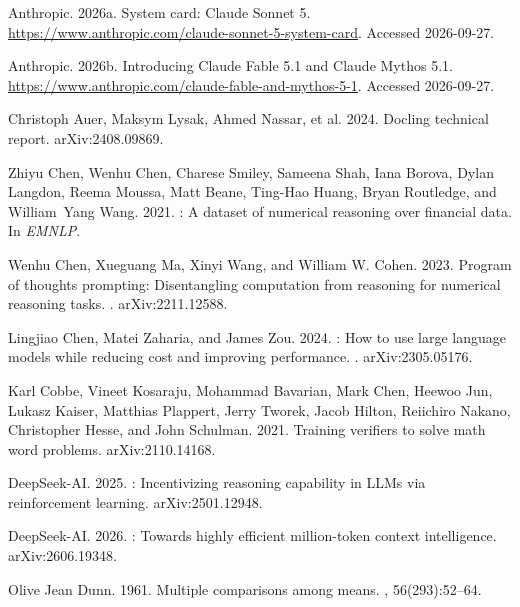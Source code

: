\documentclass[11pt]{article}%
\begin{document}
\begin{thebibliography}{}

Anthropic. 2026a.
\newblock System card: {Claude Sonnet 5}.
\newblock \url{https://www.anthropic.com/claude-sonnet-5-system-card}. Accessed 2026-09-27.

Anthropic. 2026b.
\newblock Introducing {Claude Fable 5.1} and {Claude Mythos 5.1}.
\newblock \url{https://www.anthropic.com/claude-fable-and-mythos-5-1}. Accessed 2026-09-27.

Christoph Auer, Maksym Lysak, Ahmed Nassar, et al. 2024.
\newblock Docling technical report.
\newblock arXiv:2408.09869.

Zhiyu Chen, Wenhu Chen, Charese Smiley, Sameena Shah, Iana Borova, Dylan
  Langdon, Reema Moussa, Matt Beane, Ting-Hao Huang, Bryan Routledge, and
  William~Yang Wang. 2021.
: A dataset of numerical reasoning over financial data.
\newblock In {\em EMNLP}.

Wenhu Chen, Xueguang Ma, Xinyi Wang, and William W. Cohen. 2023.
\newblock Program of thoughts prompting: Disentangling computation from
  reasoning for numerical reasoning tasks.
. arXiv:2211.12588.

Lingjiao Chen, Matei Zaharia, and James Zou. 2024.
: How to use large language models while reducing cost
  and improving performance.
. arXiv:2305.05176.

Karl Cobbe, Vineet Kosaraju, Mohammad Bavarian, Mark Chen, Heewoo Jun, Lukasz
  Kaiser, Matthias Plappert, Jerry Tworek, Jacob Hilton, Reiichiro Nakano,
  Christopher Hesse, and John Schulman. 2021.
\newblock Training verifiers to solve math word problems.
\newblock arXiv:2110.14168.

DeepSeek-AI. 2025.
: Incentivizing reasoning capability in {LLMs} via
  reinforcement learning.
\newblock arXiv:2501.12948.

DeepSeek-AI. 2026.
: Towards highly efficient million-token context
  intelligence.
\newblock arXiv:2606.19348.

Olive Jean Dunn. 1961.
\newblock Multiple comparisons among means.
,
  56(293):52--64.


\end{thebibliography}
\end{document}
